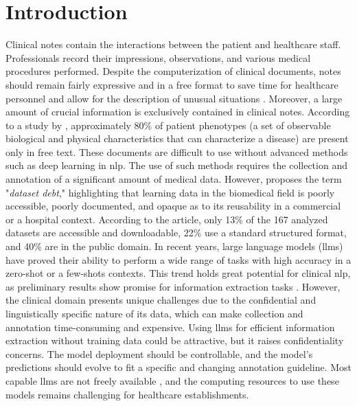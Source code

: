 \section{Introduction}
Clinical notes contain the interactions between the patient and healthcare staff. Professionals record their impressions, observations, and various medical procedures performed. Despite the computerization of clinical documents, notes should remain fairly expressive and in a free format to save time for healthcare personnel and allow for the description of unusual situations \citep{rosenbloomDataClinicalNotes2011}. Moreover, a large amount of crucial information is exclusively contained in clinical notes. According to a study by \citet{Escudie2017ADisease}, approximately 80\% of patient phenotypes (a set of observable biological and physical characteristics that can characterize a disease) are present only in free text. These documents are difficult to use without advanced methods such as deep learning in \gls{nlp}. The use of such methods requires the collection and annotation of a significant amount of medical data. However, \citet{Fries2022DatasetModeling} proposes the term "\emph{dataset debt}," highlighting that learning data in the biomedical field is poorly accessible, poorly documented, and opaque as to its reusability in a commercial or a hospital context. According to the article, only 13\% of the 167 analyzed datasets are accessible and downloadable, 22\% use a standard structured format, and 40\% are in the public domain.
In recent years, large language models (\glspl{llm}) have proved their ability to perform a wide range of tasks with high accuracy in a zero-shot or a few-shots contexts.
This trend holds great potential for clinical \gls{nlp}, as preliminary results show promise for information extraction tasks \citep{Agrawal2022LargeExtractors}. 
However, the clinical domain presents unique challenges due to the confidential and linguistically specific nature of its data, which can make collection and annotation time-consuming and expensive.
Using \glspl{llm} for efficient information extraction without training data could be attractive, but it raises confidentiality concerns.
The model deployment should be controllable, and the model's predictions should evolve to fit a specific and changing annotation guideline.
Most capable \glspl{llm} are not freely available \citep{ouyang2022training,Thoppilan2022LaMDA:Applications}, and the computing resources to use these models remains challenging for healthcare establishments.

